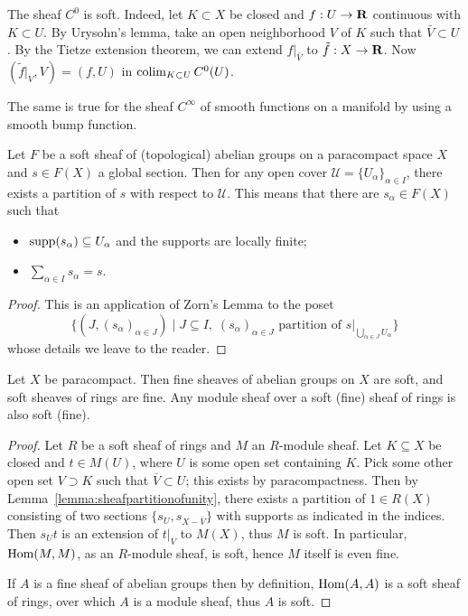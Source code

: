 \documentclass[a4paper,openany]{scrbook}
\begin{document}
\begin{example}
The sheaf $C^0$ is soft. Indeed, let $K \subset X$ be closed and $f:U \to \mathbf R$ continuous with $K \subset U$. By Urysohn's lemma, take an open neighborhood $V$ of $K$ such that $\bar{V} \subset U$. By the Tietze extension theorem, we can extend $f|_{\bar{V}}$ to $\tilde{f}:X \to \mathbf R$. Now $(\tilde{f}|_V,V) = (f,U)$ in $\operatorname*{colim}_{K \subset U}C^0(U)$.

 The same is true for the sheaf $C^\infty$ of smooth functions on a manifold by using a smooth bump function.
\end{example}

\begin{lemma}\label{lemma:sheafpartitionofunity}
Let $F$ be a soft sheaf of (topological) abelian groups on a paracompact space $X$ and $s \in F(X)$ a global section. Then for any open cover $\mathcal U = \{U_\alpha\}_{\alpha \in I}$, there exists a partition of $s$ with respect to $\mathcal U$. This means that there are $s_\alpha \in F(X)$ such that
\begin{itemize}
\item $\operatorname{supp}(s_\alpha) \subseteq U_\alpha$ and the supports are locally finite;
\item $\sum_{\alpha \in I} s_\alpha = s$.
\end{itemize}
\end{lemma}
\begin{proof}
This is an application of Zorn's Lemma to the poset
\[
\{(J,(s_\alpha)_{\alpha \in J}) \mid J \subseteq I,\; (s_\alpha)_{\alpha \in J} \text{ partition of }s|_{\bigcup_{\alpha \in J} U_\alpha}\}
\]
whose details we leave to the reader.
\end{proof}

\begin{prop}\label{prop:finesoftsheaves}
Let $X$ be paracompact. Then fine sheaves of abelian groups on $X$ are soft, and soft sheaves of rings are fine. Any module sheaf over a soft (fine) sheaf of rings is also soft (fine).
\end{prop}
\begin{proof}
Let $R$ be a soft sheaf of rings and $M$ an $R$-module sheaf. Let $K \subseteq X$ be closed and $t \in M(U)$, where $U$ is some open set containing $K$. Pick some other open set $V \supset K$ such that $\overline V \subset U$; this exists by paracompactness. Then by Lemma~\ref{lemma:sheafpartitionofunity}, there exists a partition of $1 \in R(X)$ consisting of two sections $\{s_U,s_{X-\overline V}\}$ with supports as indicated in the indices. Then $s_U t$ is an extension of $t|_V$ to $M(X)$, thus $M$ is soft. In particular, $\operatorname{Hom}(M,M)$, as an $R$-module sheaf, is soft, hence $M$ itself is even fine.

If $A$ is a fine sheaf of abelian groups then by definition, $\operatorname{Hom}(A,A)$ is a soft sheaf of rings, over which $A$ is a module sheaf, thus $A$ is soft.
\end{proof}
\end{document}
